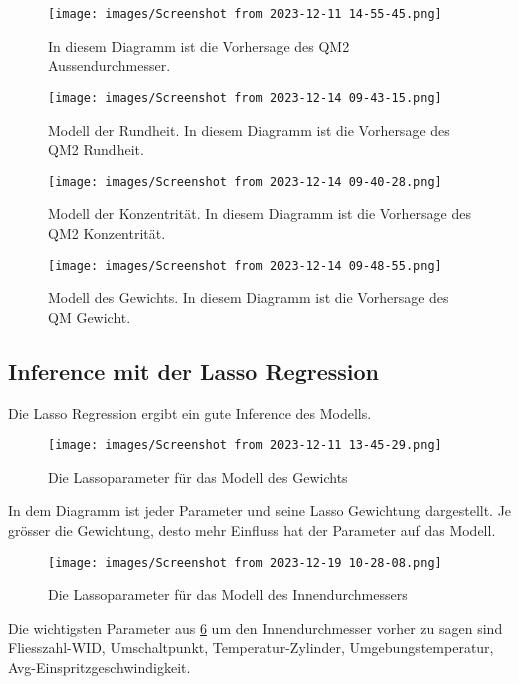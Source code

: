 \begin{figure} 
   
  \texttt{[image: images/Screenshot from 2023-12-11 14-55-45.png]}
  \caption{In diesem Diagramm ist die Vorhersage des QM2 Aussendurchmesser.}
  \label{fig:VA}
\end{figure}


\begin{figure} 
   
  \texttt{[image: images/Screenshot from 2023-12-14 09-43-15.png]}
  \caption{Modell der Rundheit. In diesem Diagramm ist die Vorhersage des QM2 Rundheit.}
  \label{fig:VR}
\end{figure}


\begin{figure} 
   
  \texttt{[image: images/Screenshot from 2023-12-14 09-40-28.png]}
  \caption{Modell der Konzentrität. In diesem Diagramm ist die Vorhersage des QM2 Konzentrität.}
  \label{fig:VK}
\end{figure}


\begin{figure} 
   
  \texttt{[image: images/Screenshot from 2023-12-14 09-48-55.png]}
  \caption{Modell des Gewichts. In diesem Diagramm ist die Vorhersage des QM Gewicht.}
  \label{fig:VG}
\end{figure}



\subsection{Inference mit der Lasso Regression}
Die Lasso Regression ergibt ein gute Inference des Modells.


\begin{figure} 
   
  \texttt{[image: images/Screenshot from 2023-12-11 13-45-29.png]}
  \caption{Die Lassoparameter für das Modell des Gewichts}
  \label{fig:PLG}
\end{figure}

In dem Diagramm ist jeder Parameter und seine Lasso Gewichtung dargestellt. Je grösser die Gewichtung, desto mehr Einfluss hat der Parameter auf das Modell.

\begin{figure} 
   
  \texttt{[image: images/Screenshot from 2023-12-19 10-28-08.png]}
  \caption{Die Lassoparameter für das Modell des Innendurchmessers}
  \label{fig:PLI}
\end{figure}
Die wichtigsten Parameter aus \ref{fig:PLI} um den Innendurchmesser vorher zu sagen sind Fliesszahl-WID, Umschaltpunkt, Temperatur-Zylinder, Umgebungstemperatur, Avg-Einspritzgeschwindigkeit.

